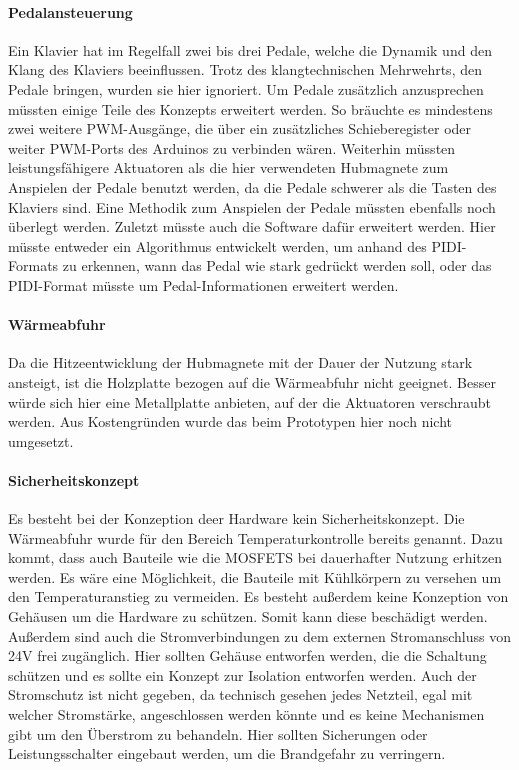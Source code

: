 \paragraph{Pedalansteuerung}
Ein Klavier hat im Regelfall zwei bis drei Pedale, welche die Dynamik und den Klang des Klaviers beeinflussen.
Trotz des klangtechnischen Mehrwehrts, den Pedale bringen, wurden sie hier ignoriert.
Um Pedale zusätzlich anzusprechen müssten einige Teile des Konzepts erweitert werden.
So bräuchte es mindestens zwei weitere \ac{PWM}-Ausgänge, die über ein zusätzliches Schieberegister oder weiter \ac{PWM}-Ports des Arduinos zu verbinden wären.
Weiterhin müssten leistungsfähigere Aktuatoren als die hier verwendeten Hubmagnete zum Anspielen der Pedale benutzt werden, da die Pedale schwerer als die Tasten des Klaviers sind.
Eine Methodik zum Anspielen der Pedale müssten ebenfalls noch überlegt werden.
Zuletzt müsste auch die Software dafür erweitert werden.
Hier müsste entweder ein Algorithmus entwickelt werden, um anhand des \ac{PIDI}-Formats zu erkennen, wann das Pedal wie stark gedrückt werden soll, oder das \ac{PIDI}-Format müsste um Pedal-Informationen erweitert werden.

\paragraph{Wärmeabfuhr}
Da die Hitzeentwicklung der Hubmagnete mit der Dauer der Nutzung stark ansteigt, ist die Holzplatte bezogen auf die Wärmeabfuhr nicht geeignet.
Besser würde sich hier eine Metallplatte anbieten, auf der die Aktuatoren verschraubt werden.
Aus Kostengründen wurde das beim Prototypen hier noch nicht umgesetzt.

\paragraph{Sicherheitskonzept}
Es besteht bei der Konzeption deer Hardware kein Sicherheitskonzept. Die Wärmeabfuhr wurde für den Bereich Temperaturkontrolle
bereits genannt. Dazu kommt, dass auch Bauteile wie die MOSFETS bei dauerhafter Nutzung erhitzen werden. Es wäre eine Möglichkeit,
die Bauteile mit Kühlkörpern zu versehen um den Temperaturanstieg zu vermeiden.\newline
Es besteht außerdem keine Konzeption von Gehäusen um die Hardware zu schützen. Somit kann diese beschädigt werden. Außerdem
sind auch die Stromverbindungen zu dem externen Stromanschluss von 24V frei zugänglich. Hier sollten Gehäuse entworfen werden,
die die Schaltung schützen und es sollte ein Konzept zur Isolation entworfen werden.\newline
Auch der Stromschutz ist nicht gegeben, da technisch gesehen jedes Netzteil, egal mit welcher Stromstärke, angeschlossen
werden könnte und es keine Mechanismen gibt um den Überstrom zu behandeln. Hier sollten Sicherungen oder Leistungsschalter
eingebaut werden, um die Brandgefahr zu verringern.

